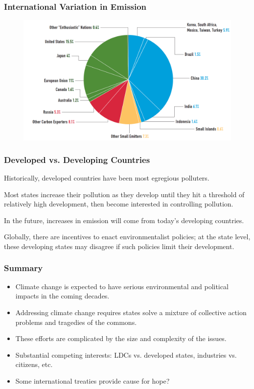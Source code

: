 \documentclass{beamer}
\begin{document}
\begin{frame} 
	\frametitle{\LARGE{International Variation in Emission}}
	\begin{figure}[ht!]
		\centering
		\includegraphics[width=\textwidth,height=0.8\textheight, keepaspectratio]{./emit_dist.png}
	\end{figure}
\end{frame}

\begin{frame} 
	\frametitle{\LARGE{Developed vs. Developing Countries}}
	\begin{itemize}
		\large{
			\item Historically, developed countries have been most egregious polluters. \pause
			
			\item Most states increase their pollution as they develop until they hit a threshold of relatively high development, then become interested in controlling pollution. \pause
			
			\item In the future, increases in emission will come from today's developing countries. \pause
			
			\item Globally, there are incentives to enact environmentalist policies; at the state level, these developing states may disagree if such policies limit their development.
		}
	\end{itemize}
\end{frame}

\begin{frame} 
	\frametitle{\LARGE{Summary}}
	\begin{itemize}
		\item Climate change is expected to have serious environmental and political impacts in the coming decades. \pause
		\item Addressing climate change requires states solve a mixture of collective action problems and tragedies of the commons. \pause
		\item These efforts are complicated by the size and complexity of the issues. \pause
		\item Substantial competing interests: LDCs vs. developed states, industries vs. citizens, etc. \pause
		\item Some international treaties provide cause for hope?		
	\end{itemize}
\end{frame}
\end{document}

